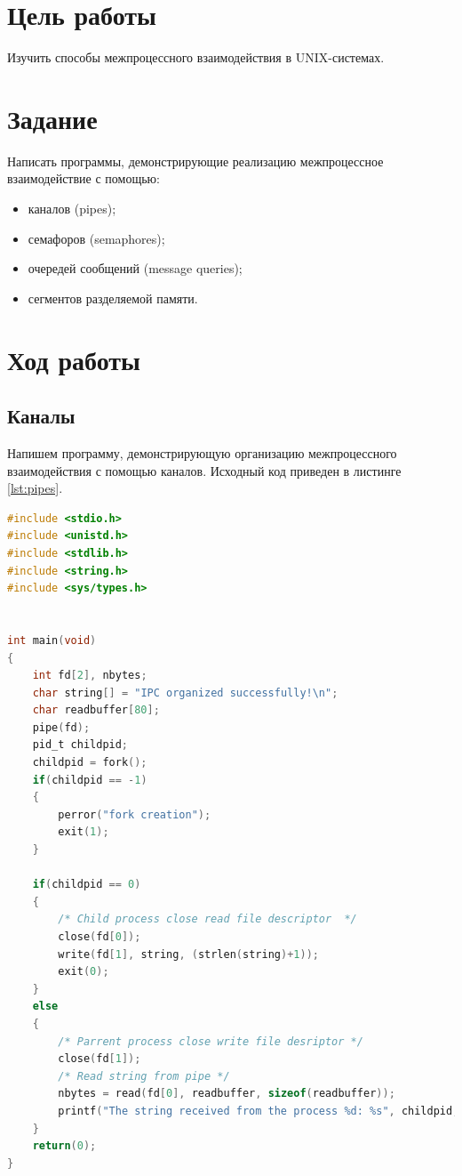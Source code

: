 \documentclass[a4paper,14pt]{extarticle}
\newcommand{\pathToCommonFolder}{/home/denilai/Documents/repos/latex/Common}
\begin{document}
	\thispagestyle{empty}
	
	\newpage
	\tableofcontents
	\newpage
	
\normalsize


\section{Цель работы}
Изучить способы межпроцессного взаимодействия в UNIX-системах.

\section{Задание}
Написать программы, демонстрирующие реализацию межпроцессное взаимодействие с помощью:
\begin{itemize}
	\item каналов (pipes);
	\item семафоров (semaphores);
	\item очередей сообщений (message queries);
	\item сегментов разделяемой памяти.
\end{itemize}

\section{Ход работы}

\subsection{Каналы}

Напишем программу, демонстрирующую организацию межпроцессного взаимодействия с помощью каналов. Исходный код приведен в листинге \ref{lst:pipes}.

\begin{lstlisting}[language=C, caption={pipes.c}, label={lst:pipes}]
#include <stdio.h>
#include <unistd.h>
#include <stdlib.h>
#include <string.h>
#include <sys/types.h>


int main(void)
{
	int fd[2], nbytes;
	char string[] = "IPC organized successfully!\n";
	char readbuffer[80]; 
	pipe(fd);
	pid_t childpid;
	childpid = fork();
	if(childpid == -1)
	{
		perror("fork creation");
		exit(1);
	}

	if(childpid == 0)
	{
		/* Child process close read file descriptor  */ 
		close(fd[0]);
		write(fd[1], string, (strlen(string)+1));
		exit(0);
	}
	else
	{
		/* Parrent process close write file desriptor */ 
		close(fd[1]);
		/* Read string from pipe */ 
		nbytes = read(fd[0], readbuffer, sizeof(readbuffer)); 
		printf("The string received from the process %d: %s", childpid, readbuffer);
	}
	return(0);
}
\end{lstlisting}
\end{document}
